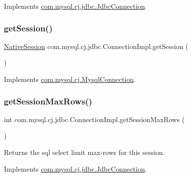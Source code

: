 Implements \mbox{\hyperlink{interfacecom_1_1mysql_1_1cj_1_1jdbc_1_1_jdbc_connection_a463e239b2b6901e85834e64ebda84d0c}{com.\+mysql.\+cj.\+jdbc.\+Jdbc\+Connection}}.

\mbox{\label{classcom_1_1mysql_1_1cj_1_1jdbc_1_1_connection_impl_a70670228bbdfc0e4474904f57b87d64d}} 
\subsubsection{\texorpdfstring{get\+Session()}{getSession()}}
{\footnotesize\ttfamily \mbox{\hyperlink{classcom_1_1mysql_1_1cj_1_1_native_session}{Native\+Session}} com.\+mysql.\+cj.\+jdbc.\+Connection\+Impl.\+get\+Session (\begin{DoxyParamCaption}{ }\end{DoxyParamCaption})}



Implements \mbox{\hyperlink{interfacecom_1_1mysql_1_1cj_1_1_mysql_connection_ac1220f01fc29222847acfba3035a860a}{com.\+mysql.\+cj.\+Mysql\+Connection}}.

\mbox{\label{classcom_1_1mysql_1_1cj_1_1jdbc_1_1_connection_impl_ab5ca44f0832ea325d7b9d6acb8e2209c}} 
\subsubsection{\texorpdfstring{get\+Session\+Max\+Rows()}{getSessionMaxRows()}}
{\footnotesize\ttfamily int com.\+mysql.\+cj.\+jdbc.\+Connection\+Impl.\+get\+Session\+Max\+Rows (\begin{DoxyParamCaption}{ }\end{DoxyParamCaption})}

Returns the sql select limit max-\/rows for this session. 

Implements \mbox{\hyperlink{interfacecom_1_1mysql_1_1cj_1_1jdbc_1_1_jdbc_connection_ab5a06def600625b8d101a40023ff2856}{com.\+mysql.\+cj.\+jdbc.\+Jdbc\+Connection}}.

